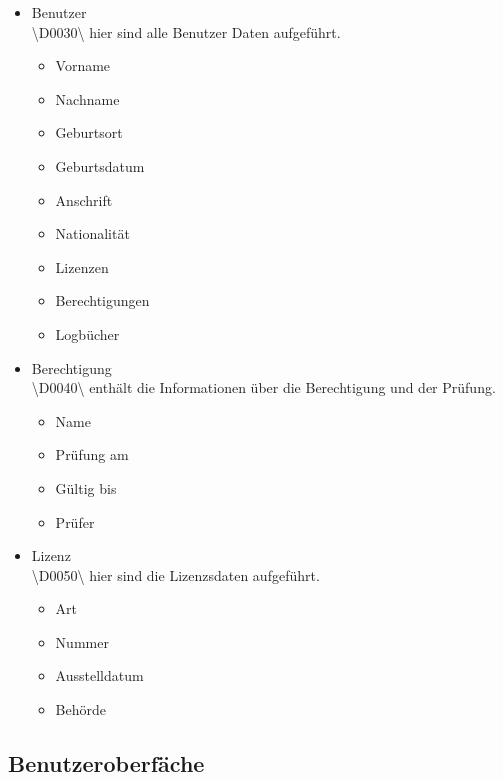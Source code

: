 \documentclass[a4paper]{article} %
\begin{document}
\begin{itemize}
        \pagebreak
        
        \noindent \vspace{0.5cm}
        \item Benutzer\\
        \textbackslash D0030\textbackslash{} hier sind alle Benutzer Daten aufgeführt.
        \begin{itemize}
            \item Vorname
            \item Nachname
            \item Geburtsort
            \item Geburtsdatum
            \item Anschrift
            \item Nationalität
            \item Lizenzen
            \item Berechtigungen
            \item Logbücher
        \end{itemize}
        \item Berechtigung\\
        \textbackslash D0040\textbackslash{} enthält die Informationen über die Berechtigung und der Prüfung.
        \begin{itemize}
            \item Name
            \item Prüfung am
            \item Gültig bis
            \item Prüfer
        \end{itemize}
        \item Lizenz\\
        \textbackslash D0050\textbackslash{} hier sind die Lizenzsdaten aufgeführt.
        \begin{itemize}
            \item Art
            \item Nummer
            \item Ausstelldatum
            \item Behörde
        \end{itemize}
    \end{itemize}
    
    \pagebreak
    \subsection{Benutzeroberfäche}
    \vspace{1cm}
\end{document}
